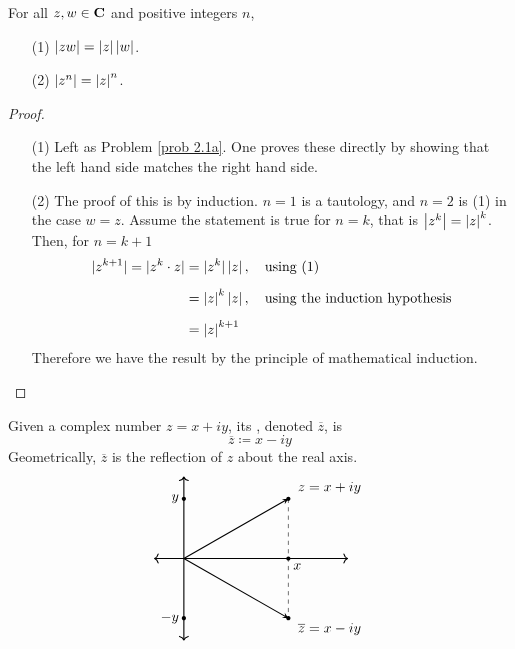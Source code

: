 \vspace*{1em}

\begin{proposition}\label{normmult}
For all $z,w \in \mathbf C$ and positive integers $n$, 
\begin{itemize}
\item[(1)] $\left\lvert zw\right\rvert = \left\lvert z\right\rvert\left\lvert w\right\rvert$.
\item[(2)] $\left\lvert z^n\right\rvert = \left\lvert z\right\rvert^n$.
\end{itemize}
\end{proposition}
\begin{proof}\hfill
\begin{itemize}
\item[(1)] Left as Problem \ref{prob 2.1a}. One proves these directly by showing that the left hand side matches the right hand side.
\item[(2)] The proof of this is by induction. $n = 1$ is a tautology, and $n = 2$ is (1) in the case $w = z$. Assume the statement is true for $n = k$, that is $\left\lvert z^k\right\rvert = \left\lvert z\right\rvert^k$. Then, for $n = k + 1$
\begin{align*}
|z^{k+1}| = |z^k\cdot z| &= |z^k|\left\lvert z\right\rvert,\quad \text{using (1)}\\[0.5em]
&= \left\lvert z\right\rvert^k\left\lvert z\right\rvert,\quad \text{using the induction hypothesis}\\[0.5em]
&= \left\lvert z\right\rvert^{k+1}
\end{align*}
Therefore we have the result by the principle of mathematical induction.
\end{itemize}
\vspace*{-\baselineskip}
\end{proof}

\vspace*{1em}

\begin{definition}
Given a complex number $z = x + iy$, its , denoted $\overline{z}$, is
\[\overline{z} \coloneqq x - iy\]
Geometrically, $\overline{z}$ is the reflection of $z$ about the real axis. 
\[\begin{tikzpicture}[scale=0.75]
    \draw[<->,thick] (-1,0)--(5.5,0);
	\draw[<->,thick] (0,-2.75)--(0,2.75);
    \fill (3.5,2) circle (2pt) node[above right]{\ $z = x+iy$};
    \draw[->,>=stealth,thick] (0,0) -- (3.5,2);
    \fill (3.5,-2) circle (2pt) node[below right]{\ $\overline{z} = x-iy$};
    \draw[->,>=stealth,thick] (0,0) -- (3.5,-2);
    \draw[-,dashed] (3.5,2) -- (3.5,-2);
    \fill (3.5,0) circle (2pt) node[below right]{$x$};
    \fill (0,2) circle (2pt) node[left]{$y$};
    \fill (0,-2) circle (2pt) node[left]{$-y$};
  \end{tikzpicture}\]
\end{definition}


